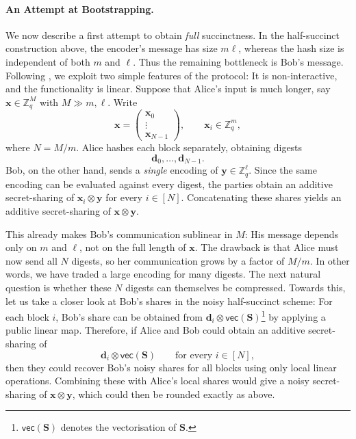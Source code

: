 \documentclass{theoretics}
\begin{document}
{\paragraph{An Attempt at Bootstrapping.}
We now describe a first attempt to obtain \emph{full} succinctness. In the half-succinct construction above, the encoder's message has size $m\ell$, whereas the hash size is independent of both $m$ and $\ell$. Thus the remaining bottleneck is Bob's message.
Following \cite{EC:AbrRoySch24}, we exploit two simple features of the protocol: It is non-interactive, and the functionality is linear. Suppose that Alice's input is much longer, say $\mathbf{x}\in\mathbb{Z}_q^M$ with $M \gg m,\ell$. Write
\[
\mathbf{x} = \begin{pmatrix}\mathbf{x}_0\\\vdots\\\mathbf{x}_{N-1}\end{pmatrix},
\qquad
\mathbf{x}_i \in \mathbb{Z}_q^m,
\]
where $N=M/m$. Alice hashes each block separately, obtaining digests
\[
\mathbf{d}_0,\ldots,\mathbf{d}_{N-1}.
\]
Bob, on the other hand, sends a \emph{single} encoding of $\mathbf{y}\in\mathbb{Z}_q^\ell$. Since the same encoding can be evaluated against every digest, the parties obtain an additive secret-sharing of $\mathbf{x}_i\otimes \mathbf{y}$ for every $i\in[N]$. Concatenating these shares yields an additive secret-sharing of $\mathbf{x}\otimes \mathbf{y}$.}

{This already makes Bob's communication sublinear in $M$: His message depends only on $m$ and $\ell$, not on the full length of $\mathbf{x}$. The drawback is that Alice must now send all $N$ digests, so her communication grows by a factor of $M/m$. In other words, we have traded a large encoding for many digests.
The next natural question is whether these $N$ digests can themselves be compressed. Towards this, let us take a closer look at Bob's shares in the noisy half-succinct scheme: For each block $i$, Bob's share can be obtained from
$\mathbf{d}_i \otimes \mathsf{vec}(\mathbf{S})$\footnote{$\mathsf{vec}(\mathbf{S})$ denotes the vectorisation of $\mathbf{S}$.}
by applying a public linear map.
Therefore, if Alice and Bob could obtain an additive secret-sharing of
\[
\mathbf{d}_i \otimes \mathsf{vec}(\mathbf{S})
\qquad\text{for every } i\in[N],
\]
then they could recover Bob's noisy shares for all blocks using only local linear operations. Combining these with Alice's local shares would give a noisy secret-sharing of $\mathbf{x}\otimes \mathbf{y}$, which could then be rounded exactly as above.}
\end{document}
